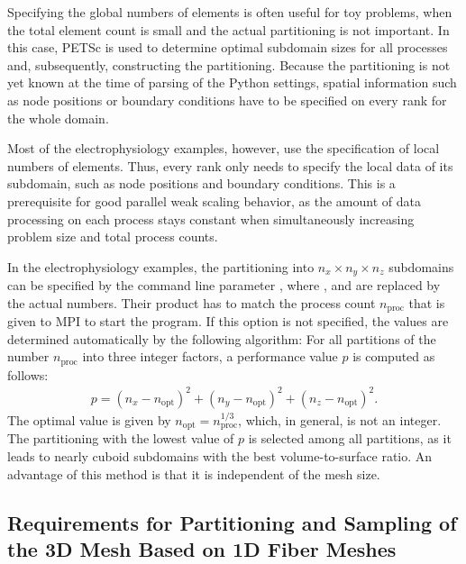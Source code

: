 Specifying the global numbers of elements is often useful for toy problems, when the total element count is small and the actual partitioning is not important. In this case, PETSc is used to determine optimal subdomain sizes for all processes and, subsequently, constructing the partitioning. Because the partitioning is not yet known at the time of parsing of the Python settings, spatial information such as node positions or boundary conditions have to be specified on every rank for the whole domain.

Most of the electrophysiology examples, however, use the specification of local numbers of elements. Thus, every rank only needs to specify the local data of its subdomain, such as node positions and boundary conditions. This is a prerequisite for good parallel weak scaling behavior, as the amount of data processing on each process stays constant when simultaneously increasing problem size and total process counts.

In the electrophysiology examples, the partitioning into $n_x \times n_y \times n_z$ subdomains can be specified by the command line parameter , where ,  and  are replaced by the actual numbers. Their product has to match the process count $n_\text{proc}$ that is given to MPI to start the program.
If this option is not specified, the values are determined automatically by the following algorithm: For all partitions of the number $n_\text{proc}$ into three integer factors, a performance value $p$ is computed as follows:
%
\begin{align*}
  p = (n_x-n_\text{opt})^2 + (n_y-n_\text{opt})^2 + (n_z-n_\text{opt})^2.
\end{align*}
The optimal value is given by $n_\text{opt} = n_\text{proc}^{1/3}$, which, in general, is not an integer. The partitioning with the lowest value of $p$ is selected among all partitions, as it leads to nearly cuboid subdomains with the best volume-to-surface ratio. An advantage of this method is that it is independent of the mesh size.

\subsection{Requirements for Partitioning and Sampling of the 3D Mesh Based on 1D Fiber Meshes}\label{sec:partitioning_requirements}

